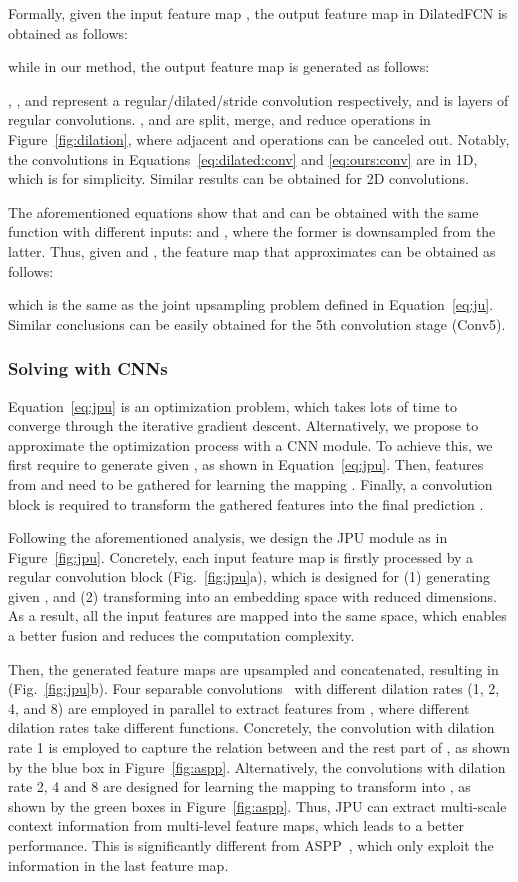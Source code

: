 \documentclass[10pt,twocolumn,letterpaper]{article}
\begin{document}
Formally, given the input feature map , the output feature map  in DilatedFCN is obtained as follows:

while in our method, the output feature map  is generated as follows:

, , and  represent a regular/dilated/stride convolution respectively, and  is  layers of regular convolutions.
,  and  are split, merge, and reduce operations in Figure~\ref{fig:dilation}, where adjacent  and  operations can be canceled out.
Notably, the convolutions in Equations~\ref{eq:dilated:conv} and \ref{eq:ours:conv} are in 1D, which is for simplicity.
Similar results can be obtained for 2D convolutions.

The aforementioned equations show that  and  can be obtained with the same function  with different inputs:  and , where the former is downsampled from the latter.
Thus, given  and , the feature map  that approximates  can be obtained as follows:

which is the same as the joint upsampling problem defined in Equation~\ref{eq:ju}.
Similar conclusions can be easily obtained for the 5th convolution stage (Conv5).
\subsubsection{Solving with CNNs}
\quad Equation~\ref{eq:jpu} is an optimization problem, which takes lots of time to converge through the iterative gradient descent.
Alternatively, we propose to approximate the optimization process with a CNN module.
To achieve this, we first require to generate  given , as shown in Equation~\ref{eq:jpu}.
Then, features from  and  need to be gathered for learning the mapping .
Finally, a convolution block is required to transform the gathered features into the final prediction .

Following the aforementioned analysis, we design the JPU module as in Figure~\ref{fig:jpu}. 
Concretely, each input feature map is firstly processed by a regular convolution block (Fig.~\ref{fig:jpu}a), which is designed for (1) generating  given , and (2) transforming  into an embedding space with reduced dimensions.
As a result, all the input features are mapped into the same space, which enables a better fusion and reduces the computation complexity.

Then, the generated feature maps are upsampled and concatenated, resulting in  (Fig.~\ref{fig:jpu}b).
Four separable convolutions~\cite{howard2017mobilenets,chollet2017xception} with different dilation rates (1, 2, 4, and 8) are employed in parallel to extract features from , where different dilation rates take different functions.
Concretely, the convolution with dilation rate 1 is employed to capture the relation between  and the rest part of , as shown by the blue box in Figure~\ref{fig:aspp}.
Alternatively, the convolutions with dilation rate 2, 4 and 8 are designed for learning the mapping  to transform  into , as shown by the green boxes in Figure~\ref{fig:aspp}.
Thus, JPU can extract multi-scale context information from multi-level feature maps, which leads to a better performance.
This is significantly different from ASPP~\cite{chen2017rethinking}, which only exploit the information in the last feature map.
\end{document}
